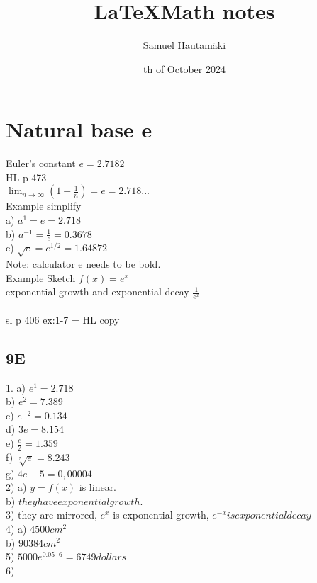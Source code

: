 \documentclass{article}
\title{\LaTeX Math notes}
\author{Samuel Hautamäki}
\date{th of October 2024}
\begin{document}
  \maketitle
   
  \section{Natural base e}
  Euler's constant $e=2.7182$\\
  HL p 473\\
  $\lim_{n\to\infty}(1+\frac{1}{n})=e=2.718...$\\
  Example simplify\\
  a) $a^1=e=2.718$\\
  b) $a^{-1}=\frac{1}{e}=0.3678$\\
  c) $\sqrt{e}=e^{1/2}=1.64872$\\
  Note: calculator e needs to be bold.\\
  Example Sketch $f(x)=e^x$\\
  exponential growth and exponential decay $\frac{1}{e^x}$\\
  \\
  sl p 406 ex:1-7 = HL copy\\
  \subsection{9E}
  1. a) $e^1=2.718$\\
  b) $e^2=7.389$\\
  c) $e^{-2}=0.134$\\
  d) $3e=8.154$\\
  e) $\frac{e}{2}=1.359$\\
  f) $\sqrt[5]{e}=8.243$\\
  g) $4e-5=0,00004$\\
  2) a) $y=f(x)$ is linear.\\
  b) $they have exponential growth.$\\
  3) they are mirrored, $e^x$ is exponential growth, $e^{-x} is exponential decay$\\
  4) a) $4500cm^2$\\
  b) $90384cm^2$\\
  5) $5000e^{0.05\cdot6}=6749dollars$\\
  6) 

   
\end{document}
